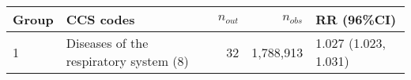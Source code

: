 \begin{tabular}{lp{6.5cm}rrp{2.2cm}}
  \hline
Group & CCS codes & $n_{out}$ & $n_{obs}$ & RR (96\%CI) \\ 
  \hline
   1 & Diseases of the respiratory system (8) &   32 & 1,788,913 & 1.027 (1.023, 1.031) \\ 
   \hline
\end{tabular}

